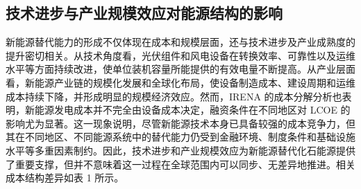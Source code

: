 \documentclass[twocolumn, a4paper, 10pt, UTF8]{ctexart}
\begin{document}
\subsection{技术进步与产业规模效应对能源结构的影响}
新能源替代能力的形成不仅体现在成本和规模层面，还与技术进步及产业成熟度的提升密切相关。从技术角度看，光伏组件和风电设备在转换效率、可靠性以及运维水平等方面持续改进，使单位装机容量所能提供的有效电量不断提高。从产业层面看，新能源产业链的规模化发展和全球化布局，使设备制造成本、建设周期和运维成本持续下降，并形成明显的规模经济效应。然而，IRENA 的成本分解分析也表明，新能源发电成本并不完全由设备成本决定，融资条件在不同地区对 LCOE 的影响尤为显著。这一现象说明，尽管新能源技术本身已具备较强的成本竞争力，但其在不同地区、不同能源系统中的替代能力仍受到金融环境、制度条件和基础设施水平等多重因素制约。因此，技术进步和产业规模效应为新能源替代化石能源提供了重要支撑，但并不意味着这一过程在全球范围内可以同步、无差异地推进。相关成本结构差异如表 1 所示。
\end{document}
